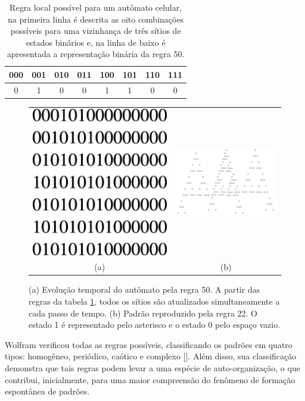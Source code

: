 \documentclass[brazil,ruledheader]{abnt}
\renewcommand{\cite}[1]{[\citeonline{#1}]}
\begin{document}
\begin{table}[!h]
\centering
\begin{tabular}{|c|c|c|c|c|c|c|c|}
\hline
 000 & 001 & 010 & 011 & 100 & 101 & 110 & 111 \\
\hline
0 & 1 & 0 & 0 & 1 & 1 & 0 & 0 \\
\hline
\end{tabular}
\caption[Regra local possível para um autômato celular.]{Regra local possível
para um autômato celular, na primeira linha é
descrita as oito combinações possíveis para uma vizinhança de três sítios de
estados binários e, na linha de baixo é apresentada a representação binária da
regra 50.}
\label{tab:tab1}
\end{table}
\begin{figure}
\centering
\begin{tabular}{cc}
\includegraphics[width=.3\linewidth]{Figuras/figura51.jpg} &
\includegraphics[width=.4\linewidth]{Figuras/figura2.jpg} \\
(a) & (b) \\
\end{tabular}
\caption [Evolução temporal e padrão do autômato]{(a) Evolução temporal do
autômato pela regra 50. A partir das regras
da tabela \ref{tab:tab1}, todos os sítios são atualizados
simultaneamente a cada passo de tempo. (b) Padrão reproduzido pela regra 22. O
estado 1 é representado pelo asterisco e o estado 0 pelo espaço vazio.}
\label{fig:arvore}
\end{figure}


Wolfram verificou todas as regras possíveis, classificando os padrões em
quatro tipos: homogêneo, periódico, caótico e complexo \cite{Wo83}.  Além
disso, sua classificação demonstra que tais regras podem levar a uma espécie
de auto-organização, o que contribui, inicialmente, para uma maior compreensão
do fenômeno de formação espontânea de padrões.
\end{document}
